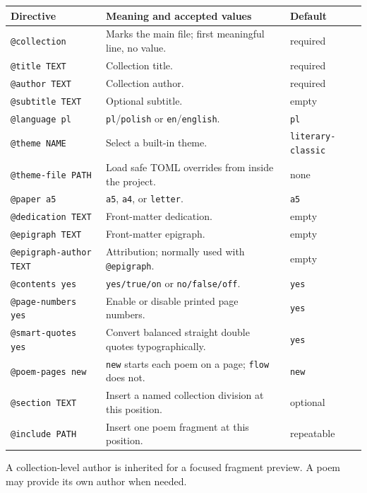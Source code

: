 \documentclass[11pt,a4paper]{article}
\makeatletter
\newcommand{\code}[1]{\texttt{#1}}
\newcommand{\directive}[1]{\texttt{@#1}}
\makeatother
\begin{document}
\begin{longtable}{@{}L{0.29\textwidth}L{0.47\textwidth}L{0.16\textwidth}@{}}
\toprule
\textbf{Directive} & \textbf{Meaning and accepted values} & \textbf{Default} \\
\midrule
\endhead
\directive{collection} & Marks the main file; first meaningful line, no value. & required \\
\directive{title TEXT} & Collection title. & required \\
\directive{author TEXT} & Collection author. & required \\
\directive{subtitle TEXT} & Optional subtitle. & empty \\
\directive{language pl} & \code{pl}/\code{polish} or \code{en}/\code{english}. & \code{pl} \\
\directive{theme NAME} & Select a built-in theme. & \code{literary-classic} \\
\directive{theme-file PATH} & Load safe TOML overrides from inside the project. & none \\
\directive{paper a5} & \code{a5}, \code{a4}, or \code{letter}. & \code{a5} \\
\directive{dedication TEXT} & Front-matter dedication. & empty \\
\directive{epigraph TEXT} & Front-matter epigraph. & empty \\
\directive{epigraph-author TEXT} & Attribution; normally used with \directive{epigraph}. & empty \\
\directive{contents yes} & \code{yes/true/on} or \code{no/false/off}. & \code{yes} \\
\directive{page-numbers yes} & Enable or disable printed page numbers. & \code{yes} \\
\directive{smart-quotes yes} & Convert balanced straight double quotes typographically. & \code{yes} \\
\directive{poem-pages new} & \code{new} starts each poem on a page; \code{flow} does not. & \code{new} \\
\directive{section TEXT} & Insert a named collection division at this position. & optional \\
\directive{include PATH} & Insert one poem fragment at this position. & repeatable \\
\bottomrule
\end{longtable}

A collection-level author is inherited for a focused fragment preview. A poem
may provide its own author when needed.
\end{document}
